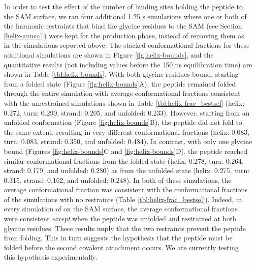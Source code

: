 In order to test the effect of the number of binding sites holding the peptide to the SAM surface, we ran four additional 1.25 \textmu{}s simulations where one or both of the harmonic restraints that bind the glycine residues to the SAM (see Section \ref{helix-anneal}) were kept for the production phase, instead of removing them as in the simulations reported above. 
The stacked conformational fractions for these additional simulations are shown in Figure \ref{fig:helix-bounds}, and the quantitative results (not including values before the 150 ns equilibration time) are shown in Table \ref{tbl:helix-bounds}. 
With both glycine residues bound, starting from a folded state (Figure \ref{fig:helix-bounds}A), the peptide remained folded through the entire simulation with average conformational fractions consistent with the unrestrained simulations shown in Table \ref{tbl:helix-frac_bestsel} (helix: 0.272, turn: 0.290, strand: 0.205, and unfolded: 0.233). 
However, starting from an unfolded conformation (Figure \ref{fig:helix-bounds}B), the peptide did not fold to the same extent, resulting in very different conformational fractions (helix: 0.083, turn: 0.083, strand: 0.350, and unfolded: 0.484). 
In contrast, with only one glycine bound (Figures \ref{fig:helix-bounds}C and \ref{fig:helix-bounds}D), the peptide reached similar conformational fractions from the folded state (helix: 0.278, turn: 0.264, strand: 0.179, and unfolded: 0.280) as from the unfolded state (helix: 0.275, turn: 0.315, strand: 0.162, and unfolded: 0.248). 
In both of these simulations, the average conformational fraction was consistent with the conformational fractions of the simulations with no restraints (Table \ref{tbl:helix-frac_bestsel}). 
Indeed, in every simulation of \pep{} on the SAM surface, the average conformational fractions were consistent \emph{except} when the peptide was unfolded and restrained at both glycine residues. 
These results imply that the two restraints prevent the peptide from folding. 
This in turn suggests the hypothesis that the peptide must be folded before the second covalent attachment occurs. 
We are currently testing this hypothesis experimentally. 

